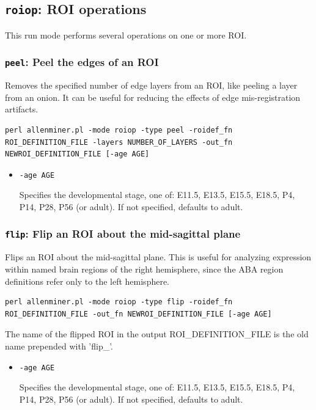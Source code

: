 \documentclass[10pt]{article}
\begin{document}
\subsection{{\tt roiop}: ROI operations}
This run mode performs several operations on one or more ROI.

\subsubsection*{{\tt peel}: Peel the edges of an ROI }

Removes the specified number of edge layers from an ROI, like peeling a layer from an onion. It can be useful for reducing the effects of edge mis-registration artifacts.\\

\begin{lstlisting}
perl allenminer.pl -mode roiop -type peel -roidef_fn ROI_DEFINITION_FILE -layers NUMBER_OF_LAYERS -out_fn NEWROI_DEFINITION_FILE [-age AGE]
\end{lstlisting}

\begin{itemize}
\item {\tt -age AGE}

Specifies the developmental stage, one of: E11.5, E13.5, E15.5, E18.5, P4, P14, P28, P56 (or adult). If not specified, defaults to adult.

\end{itemize}

\subsubsection*{{\tt flip}: Flip an ROI about the mid-sagittal plane}

Flips an ROI about the mid-sagittal plane. This is useful for analyzing expression within named brain regions of the right hemisphere, since the ABA region definitions refer only to the left hemisphere.\\

\begin{lstlisting}
perl allenminer.pl -mode roiop -type flip -roidef_fn ROI_DEFINITION_FILE -out_fn NEWROI_DEFINITION_FILE [-age AGE]
\end{lstlisting}

The name of the flipped ROI in the output ROI\_DEFINITION\_FILE is the old name prepended with 'flip\_'.

\begin{itemize}
\item {\tt -age AGE}

Specifies the developmental stage, one of: E11.5, E13.5, E15.5, E18.5, P4, P14, P28, P56 (or adult). If not specified, defaults to adult.

\end{itemize}
\end{document}
